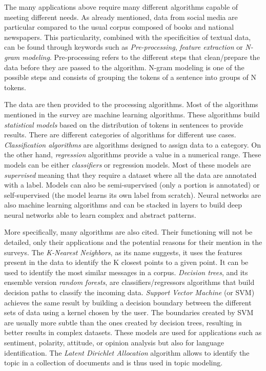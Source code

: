 The many applications above require many different algorithms capable of meeting different needs.
As already mentioned, data from social media are particular compared to the usual corpus composed of books and national newspapers.
This particularity, combined with the specificities of textual data, can be found through keywords such as \emph{Pre-processing}, \emph{feature extraction} or \emph{N-gram modeling}.
Pre-processing refers to the different steps that clean/prepare the data before they are passed to the algorithm.
N-gram modeling is one of the possible steps and consists of grouping the tokens of a sentence into groups of N tokens.

The data are then provided to the processing algorithms.
Most of the algorithms mentioned in the survey are machine learning algorithms.
These algorithms build \emph{statistical models} based on the distribution of tokens in sentences to provide results.
There are different categories of algorithms for different use cases.
\emph{Classification algorithms} are algorithms designed to assign data to a category.
On the other hand, \emph{regression} algorithms provide a value in a numerical range.
These models can be either \emph{classifiers} or regression models.
Most of these models are \emph{supervised} meaning that they require a dataset where all the data are annotated with a label.
Models can also be semi-supervised (only a portion is annotated) or self-supervised (the model learns its own label from scratch).
Neural networks are also machine learning algorithms and can be stacked in layers to build deep neural networks able to learn complex and abstract patterns.

More specifically, many algorithms are also cited. Their functioning will not be detailed, only their applications and the potential reasons for their mention in the surveys.
The \emph{K-Nearest Neighbors}, as its name suggests, it uses the features present in the data to identify the K closest points to a given point.
It can be used to identify the most similar messages in a corpus.
\emph{Decision trees}, and its ensemble version \emph{random forests}, are classifiers/regressors algorithms that build decision paths to classify the incoming data.
\emph{Support Vector Machine} (or SVM) achieves the same result by building a decision boundary between the different sets of data using a kernel chosen by the user.
The boundaries created by SVM are usually more subtle than the ones created by decision trees, resulting in better results in complex datasets.
These models are used for applications such as sentiment, polarity, attitude, or opinion analysis but also for language identification.
The \emph{Latent Dirichlet Allocation} algorithm allows to identify the topic in a collection of documents and is thus used in topic modeling.


